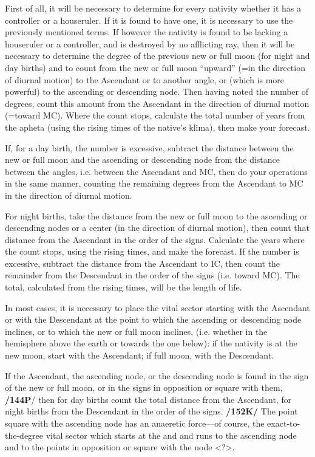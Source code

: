 First of all, it will be necessary to determine for every nativity whether it has a controller or a houseruler. If it is found to have one, it is necessary to use the previously mentioned terms. If however the nativity is found to be lacking a houseruler or a controller, and is destroyed by no afflicting ray, then it will be necessary to determine the degree of the previous new or full moon (for night and day births) and to count from the new or full moon “upward” (=in the direction of
diurnal motion) to the Ascendant or to another angle, or (which is more powerful) to the ascending or descending node. Then having noted the number of degrees, count this amount from the Ascendant in the direction of diurnal motion (=toward MC). Where the count stops, calculate the total number of years from
the apheta (using the rising times of the native’s klima), then make your forecast.

If, for a day birth, the number is excessive, subtract the distance between the new or full moon and the ascending or descending node from the distance between the angles, i.e. between the Ascendant and MC, then do your operations in the same manner, counting the remaining degrees from the Ascendant to MC in the direction of diurnal motion. 

For night births, take the distance from the new or full moon to the ascending or descending nodes or a center (in the direction of diurnal motion), then count that distance from
the Ascendant in the order of the signs. Calculate the years where the count stops, using the rising times, and make the forecast. If the number is excessive, subtract the distance from the Ascendant to IC, then count the remainder from the Descendant in the order of the signs (i.e. toward MC). The total, calculated from the rising times, will be the length of life.

In most cases, it is necessary to place the vital sector starting with the Ascendant or with the Descendant at the point to which the ascending or descending node inclines, or to which the new or full moon inclines, (i.e. whether in the hemisphere above the earth or towards the one below): if the nativity is
at the new moon, start with the Ascendant; if full moon, with the Descendant.

If the Ascendant, the ascending node, or the descending node is found in the sign of the new or full moon, or in the signs in opposition or square with them, \textbf{/144P}/ then for day births count the total distance from the Ascendant, for night births from the Descendant in the order of the signs. \textbf{/152K/} The point square with the ascending node has an anaeretic force—of course, the exact-to-the-degree vital sector which starts at the \Sun\xspace and \Moon\xspace and runs to the ascending node and to the points in opposition or square with the node <?>.

